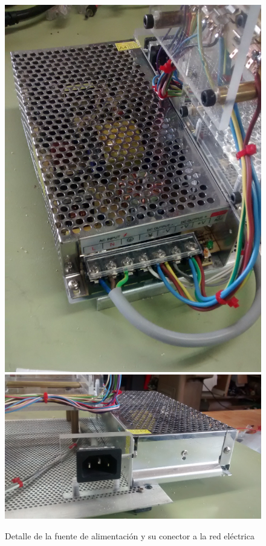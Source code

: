 \documentclass{article}
\begin{document}
\begin{figure}[H]
	\centering
	\includegraphics[height=0.25\textheight]{fotos/fuente}
	\includegraphics[height=0.25\textheight]{fotos/fuentedetalle}
	\caption{Detalle de la fuente de alimentación y su conector a la red eléctrica}
\end{figure}
\end{document}
